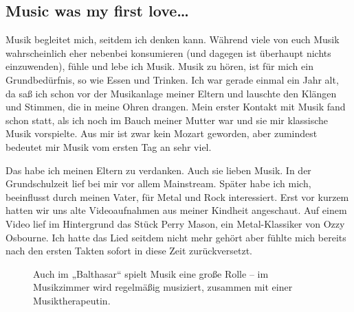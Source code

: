 \documentclass[fontsize=14pt,a4paper,headinclude,DIV=calc,automark]{scrbook}
\begin{document}
\subsection{Music was my first love…}

Musik begleitet mich, seitdem ich denken kann. Während viele von euch Musik wahrscheinlich eher nebenbei konsumieren (und dagegen ist überhaupt nichts einzuwenden), fühle und lebe ich Musik. Musik zu hören, ist für mich ein Grundbedürfnis, so wie Essen und Trinken. Ich war gerade einmal ein Jahr alt, da saß ich schon vor der Musikanlage meiner Eltern und lauschte den Klängen und Stimmen, die in meine Ohren drangen. Mein erster Kontakt mit Musik fand schon statt, als ich noch im Bauch meiner Mutter war und sie mir klassische Musik vorspielte. Aus mir ist zwar kein Mozart geworden, aber zumindest bedeutet mir Musik vom ersten Tag an sehr viel.

Das habe ich meinen Eltern zu verdanken. Auch sie lieben Musik. In der Grundschulzeit lief bei mir vor allem Mainstream. Später habe ich mich, beeinflusst durch meinen Vater, für Metal und Rock interessiert. Erst vor kurzem hatten wir uns alte Videoaufnahmen aus meiner Kindheit angeschaut. Auf einem Video lief im Hintergrund das Stück Perry Mason, ein Metal-Klassiker von Ozzy Osbourne. Ich hatte das Lied seitdem nicht mehr gehört aber fühlte mich bereits nach den ersten Takten sofort in diese Zeit zurückversetzt.

\setlength{\fboxsep}{0pt}    %
\setlength{\fboxrule}{0.2pt} %
\begin{figure}[ht]
    \raggedright
    \caption{Auch im „Balthasar“ spielt Musik eine große Rolle – im Musikzimmer wird regelmäßig musiziert, zusammen mit einer Musiktherapeutin.}
    \label{fig:musikzimmer}
\end{figure}
\end{document}
